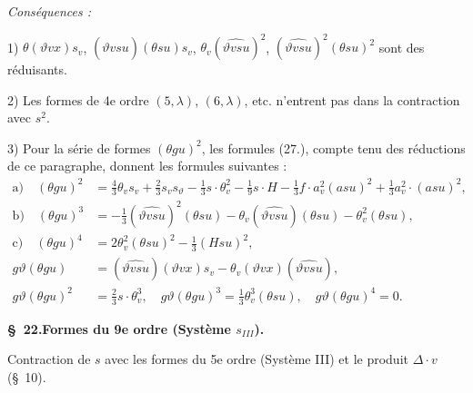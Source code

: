 \documentclass[11pt]{article}
\newcommand{\A}{\Delta}
\begin{document}
\noindent\emph{Conséquences :}

1) $\theta(\vartheta v x)s_v$, $(\widehat{\vartheta v su})(\theta su)s_v$, $\theta_v(\widehat{\vartheta v su})^2$, $(\widehat{\vartheta v su})^2(\theta su)^2$ sont des réduisants.

2) Les formes de 4e ordre $(5,\lambda)$, $(6,\lambda)$, etc. n'entrent pas dans la contraction avec $s^2$.

3) Pour la série de formes $(\theta gu)^2$, les formules (27.), compte tenu des réductions de ce paragraphe, donnent les formules suivantes :
\[
\tag{29}
\begin{aligned}
\text{a)}\quad (\theta gu)^2&=\frac43\theta_v s_v+\frac23s_v s_\vartheta-\frac13s\cdot\theta_v^2-\frac19s\cdot H-\frac13f\cdot a_v^2(asu)^2+\frac13a_v^2\cdot(asu)^2,\\
\text{b)}\quad (\theta gu)^3&=-\frac13(\widehat{\vartheta v su})^2(\theta su)-\theta_v(\widehat{\vartheta v su})(\theta su)-\theta_v^2(\theta su),\\
\text{c)}\quad (\theta gu)^4&=2\theta_v^2(\theta su)^2-\frac13(Hsu)^2,\\
g\vartheta(\theta gu)&=(\widehat{\vartheta v su})(\vartheta v x)s_v-\theta_v(\vartheta v x)(\widehat{\vartheta v su}),\\
g\vartheta(\theta gu)^2&=\frac23s\cdot\theta_v^3,
\quad g\vartheta(\theta gu)^3=\frac13\theta_v^3(\theta su),
\quad g\vartheta(\theta gu)^4=0.
\end{aligned}
\]

\begin{center}
\textbf{\S\ 22.\quad Formes du 9e ordre (Système $s_{III}$).}
\end{center}

Contraction de $s$ avec les formes du 5e ordre (Système III) et le produit $\A\cdot v$ (\S\ 10).
\end{document}
